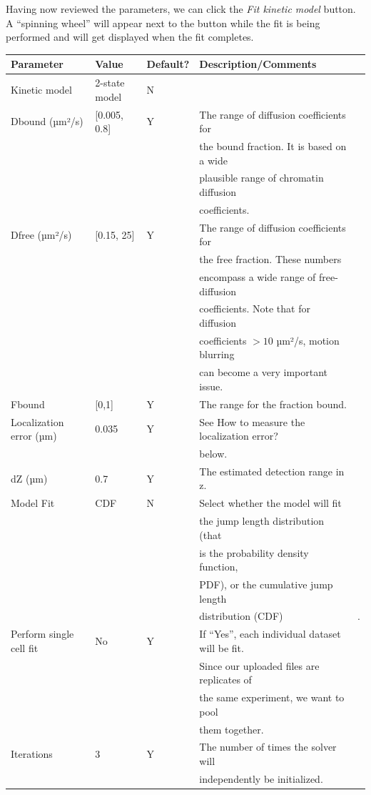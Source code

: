 Having now reviewed the parameters, we can click the \textit{Fit kinetic model} button. A ``spinning wheel'' will appear next to the button while the fit is being performed and will get displayed when the fit completes.

\begin{center}
  \label{table:table5}
\begin{tabular}{lllll}
Parameter & Value & Default? & Description/Comments & \\
\hline
Kinetic model & 2-state model & N &  & \\
Dbound (µm²/s) & [0.005, 0.8] & Y & The range of diffusion coefficients for\\&&&
the bound fraction. It is based on a wide \\&&&
plausible range of chromatin diffusion \\&&&
coefficients. & \\
Dfree (µm²/s) & [0.15, 25] & Y &
The range of diffusion coefficients for \\&&&
the free fraction. These numbers \\&&&
encompass a wide range of free-diffusion \\&&&
coefficients. Note that for diffusion \\&&&
coefficients \(> 10\) µm²/s, motion blurring \\&&&
can become a very important issue. & \\
Fbound & [0,1] & Y & The range for the fraction bound. & \\
Localization error (µm) & 0.035 & Y & See How to measure the localization error?\\&&& below. & \\
dZ (µm) & 0.7 & Y & The estimated detection range in z. & \\
Model Fit & CDF & N &
Select whether the model will fit \\&&&
the jump length distribution (that \\&&&
is the probability density function, \\&&&
PDF), or the cumulative jump length \\&&&
distribution (CDF) & .\\
Perform single cell fit & No & Y &
If ``Yes'', each individual dataset will be fit.\\&&&
Since our uploaded files are replicates of \\&&&
the same experiment, we want to pool \\&&&
them together. & \\
Iterations & 3 & Y & The number of times the solver will\\&&& independently be initialized. & \\
\end{tabular}
\end{center}

